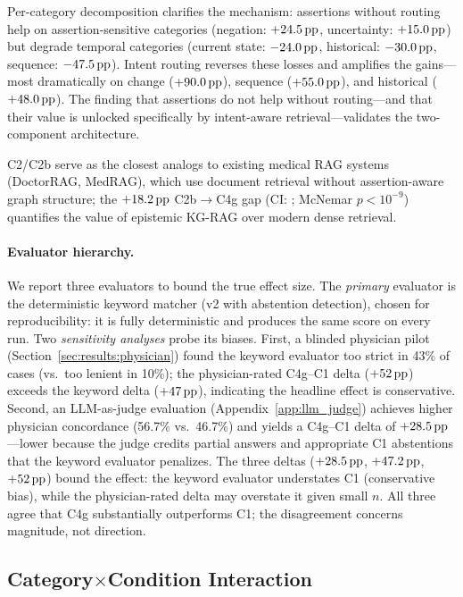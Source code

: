 Per-category decomposition clarifies the mechanism: assertions without routing help on assertion-sensitive categories (negation: $+24.5\,\text{pp}$, uncertainty: $+15.0\,\text{pp}$) but degrade temporal categories (current state: $-24.0\,\text{pp}$, historical: $-30.0\,\text{pp}$, sequence: $-47.5\,\text{pp}$).
Intent routing reverses these losses and amplifies the gains---most dramatically on change ($+90.0\,\text{pp}$), sequence ($+55.0\,\text{pp}$), and historical ($+48.0\,\text{pp}$).
The finding that assertions do not help without routing---and that their value is unlocked specifically by intent-aware retrieval---validates the two-component architecture.

C2/C2b serve as the closest analogs to existing medical RAG systems (DoctorRAG, MedRAG), which use document retrieval without assertion-aware graph structure; the $+18.2\,\text{pp}$ C2b$\to$C4g gap (CI: \ci{+12.3\pp}{+23.5\pp}; McNemar $p < 10^{-9}$) quantifies the value of epistemic KG-RAG over modern dense retrieval.

\paragraph{Evaluator hierarchy.}
We report three evaluators to bound the true effect size.
The \emph{primary} evaluator is the deterministic keyword matcher (v2 with abstention detection), chosen for reproducibility: it is fully deterministic and produces the same score on every run.
Two \emph{sensitivity analyses} probe its biases.
First, a blinded physician pilot (Section~\ref{sec:results:physician}) found the keyword evaluator too strict in 43\% of cases (vs.\ too lenient in 10\%); the physician-rated C4g--C1 delta ($+52\,\text{pp}$) exceeds the keyword delta ($+47\,\text{pp}$), indicating the headline effect is conservative.
Second, an LLM-as-judge evaluation (Appendix~\ref{app:llm_judge}) achieves higher physician concordance (56.7\% vs.\ 46.7\%) and yields a C4g--C1 delta of $+28.5\,\text{pp}$---lower because the judge credits partial answers and appropriate C1 abstentions that the keyword evaluator penalizes.
The three deltas ($+28.5\,\text{pp}$, $+47.2\,\text{pp}$, $+52\,\text{pp}$) bound the effect: the keyword evaluator understates C1 (conservative bias), while the physician-rated delta may overstate it given small $n$.
All three agree that C4g substantially outperforms C1; the disagreement concerns magnitude, not direction.

\subsection{Category$\times$Condition Interaction}
\label{sec:results:categories}

